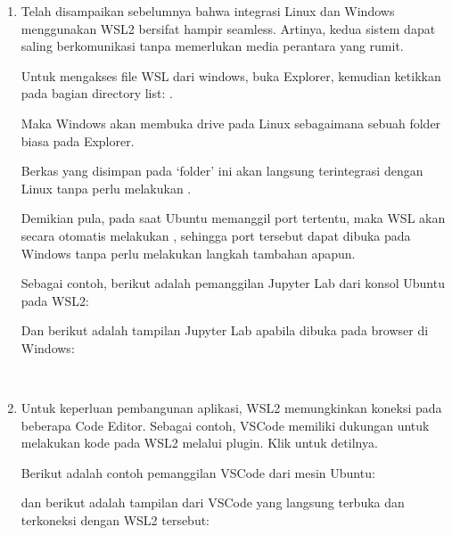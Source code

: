 \documentclass[letterpaper,10pt,english]{sphinxmanual}
\begin{document}
\begin{enumerate}

 

\item {} 

Telah disampaikan sebelumnya bahwa integrasi Linux dan Windows menggunakan WSL2 bersifat hampir seamless. Artinya, kedua sistem dapat saling berkomunikasi tanpa memerlukan media perantara yang rumit.

Untuk mengakses file WSL dari windows, buka Explorer, kemudian ketikkan pada bagian directory list: .


Maka Windows akan membuka drive pada Linux sebagaimana sebuah folder biasa pada Explorer.


Berkas yang disimpan pada ‘folder’ ini akan langsung terintegrasi dengan Linux tanpa perlu melakukan .

Demikian pula, pada saat Ubuntu memanggil port tertentu, maka WSL akan secara otomatis melakukan , sehingga port tersebut dapat dibuka pada Windows tanpa perlu melakukan langkah tambahan apapun.

Sebagai contoh, berikut adalah pemanggilan Jupyter Lab dari konsol Ubuntu pada WSL2:


Dan berikut adalah tampilan Jupyter Lab apabila dibuka pada browser di Windows:


 

\item {} 

Untuk keperluan pembangunan aplikasi, WSL2 memungkinkan koneksi pada beberapa Code Editor. Sebagai contoh, VSCode memiliki dukungan untuk melakukan  kode pada WSL2 melalui plugin. Klik  untuk detilnya.


Berikut adalah contoh pemanggilan VSCode dari mesin Ubuntu:




dan berikut adalah tampilan dari VSCode yang langsung terbuka dan terkoneksi dengan WSL2 tersebut:




\end{enumerate}
\end{document}

